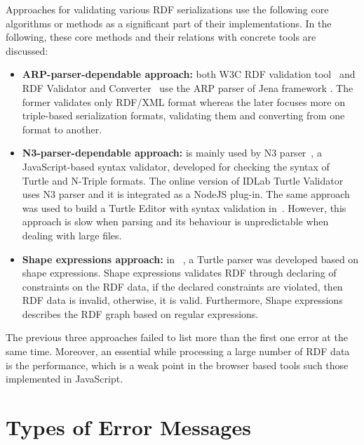 Approaches for validating various RDF serializations use the following core algorithms or methods as a significant part of their implementations. 
In the following, these core methods and their relations with concrete tools are discussed: 

\begin{itemize}[noitemsep] 

\item \textbf{ARP-parser-dependable approach:} both W3C RDF validation tool~\cite{W3C:Validation:Online} and RDF Validator and Converter~\cite{Mybluemix:Validation:Online} use the ARP parser of Jena framework \cite{McBride:2002:JSW:613357.613755}. 
The former validates only RDF/XML format whereas the later focuses more on triple-based serialization formats, validating them and converting from one format to another. 

\item \textbf{N3-parser-dependable approach:} is mainly used by N3 parser~\cite{N3Parser:Online}, a JavaScript-based syntax validator, developed for checking the syntax of Turtle and N-Triple formats. 
The online version of IDLab Turtle Validator \cite{IDLab:Validation:Online} uses N3 parser and it is integrated as a NodeJS plug-in. 
The same approach was used to build a Turtle Editor with syntax validation in~\cite{petersenturtleeditor}. 
However, this approach is slow when parsing and its behaviour is unpredictable when dealing with large files. 

\item \textbf{Shape expressions approach:} in ~\cite{prud2014shape}, a Turtle parser was developed based on shape expressions. 
Shape expressions validates RDF through declaring of constraints on the RDF data, if the declared constraints are violated, then RDF data is invalid, otherwise, it is valid. Furthermore, Shape expressions describes the RDF graph based on regular expressions. 
\end{itemize} 

The previous three approaches failed to list more than the first one error at the same time. 
Moreover, an essential while processing a large number of RDF data is the performance, which is a weak point in the browser based tools such those implemented in JavaScript.

\section{Types of Error Messages}

